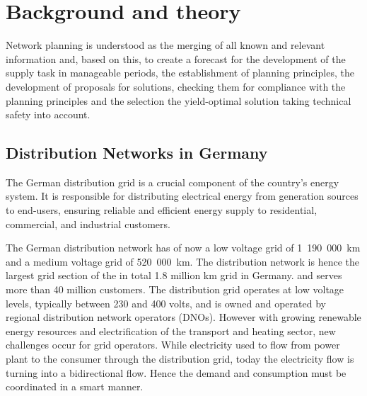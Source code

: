 \chapter{Background and theory}

Network planning is understood as the merging of all known and relevant information and, based on this, to create a forecast for the development of the supply task in manageable periods, the establishment of planning principles, the development of proposals for solutions, checking them for compliance with the planning principles and the selection the yield-optimal solution taking technical safety into account.

\section{Distribution Networks in Germany}

The German distribution grid is a crucial component of the country's energy system. It is responsible for distributing electrical energy from generation sources to end-users, ensuring reliable and efficient energy supply to residential, commercial, and industrial customers.

The German distribution network has of now a low voltage grid of 1~190~000~km and a medium voltage grid of 520~000~km. The distribution network is hence the largest grid section of the in total 1.8 million km grid in Germany.%
and serves more than 40 million customers. The distribution grid operates at low voltage levels, typically between 230 and 400 volts, and is owned and operated by regional distribution network operators (DNOs).
However with growing renewable energy resources and electrification of the transport and heating sector, new challenges occur for grid operators. While electricity used to flow from power plant to the consumer through the distribution grid, today the electricity flow is turning into a bidirectional flow. Hence the demand and consumption must be coordinated in a smart manner. 

